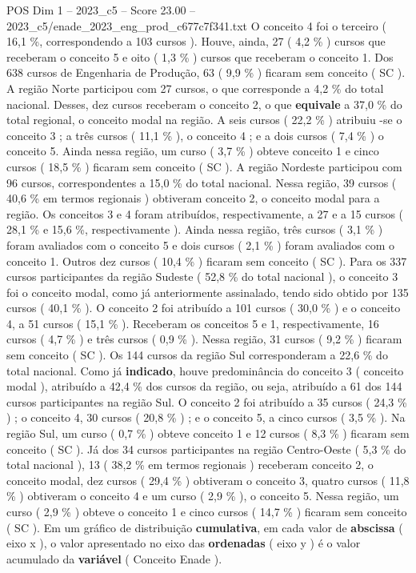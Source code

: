 \begin{textsample}{POS Dim 1 – 2023\_c5 – Score 23.00 – 2023\_c5/enade\_2023\_eng\_prod\_c677c7f341.txt}
O conceito 4 foi o terceiro ( 16,1 \%, correspondendo a 103 cursos ).
Houve, ainda, 27 ( 4,2 \% ) cursos que receberam o conceito 5 e oito ( 1,3 \% ) cursos que receberam o conceito 1.
Dos 638 cursos de Engenharia de Produção, 63 ( 9,9 \% ) ficaram sem conceito ( SC ).
A região Norte participou com 27 cursos, o que corresponde a 4,2 \% do total nacional.
Desses, dez cursos receberam o conceito 2, o que \textbf{equivale} a 37,0 \% do total regional, o conceito modal na região.
A seis cursos ( 22,2 \% ) atribuiu -se o conceito 3 ; a três cursos ( 11,1 \% ), o conceito 4 ; e a dois cursos ( 7,4 \% ) o conceito 5.
Ainda nessa região, um curso ( 3,7 \% ) obteve conceito 1 e cinco cursos ( 18,5 \% ) ficaram sem conceito ( SC ).
A região Nordeste participou com 96 cursos, correspondentes a 15,0 \% do total nacional.
Nessa região, 39 cursos ( 40,6 \% em termos regionais ) obtiveram conceito 2, o conceito modal para a região.
Os conceitos 3 e 4 foram atribuídos, respectivamente, a 27 e a 15 cursos ( 28,1 \% e 15,6 \%, respectivamente ).
Ainda nessa região, três cursos ( 3,1 \% ) foram avaliados com o conceito 5 e dois cursos ( 2,1 \% ) foram avaliados com o conceito 1.
Outros dez cursos ( 10,4 \% ) ficaram sem conceito ( SC ).
Para os 337 cursos participantes da região Sudeste ( 52,8 \% do total nacional ), o conceito 3 foi o conceito modal, como já anteriormente assinalado, tendo sido obtido por 135 cursos ( 40,1 \% ).
O conceito 2 foi atribuído a 101 cursos ( 30,0 \% ) e o conceito 4, a 51 cursos ( 15,1 \% ).
Receberam os conceitos 5 e 1, respectivamente, 16 cursos ( 4,7 \% ) e três cursos ( 0,9 \% ).
Nessa região, 31 cursos ( 9,2 \% ) ficaram sem conceito ( SC ).
Os 144 cursos da região Sul corresponderam a 22,6 \% do total nacional.
Como já \textbf{indicado}, houve predominância do conceito 3 ( conceito modal ), atribuído a 42,4 \% dos cursos da região, ou seja, atribuído a 61 dos 144 cursos participantes na região Sul.
O conceito 2 foi atribuído a 35 cursos ( 24,3 \% ) ; o conceito 4, 30 cursos ( 20,8 \% ) ; e o conceito 5, a cinco cursos ( 3,5 \% ).
Na região Sul, um curso ( 0,7 \% ) obteve conceito 1 e 12 cursos ( 8,3 \% ) ficaram sem conceito ( SC ).
Já dos 34 cursos participantes na região Centro-Oeste ( 5,3 \% do total nacional ), 13 ( 38,2 \% em termos regionais ) receberam conceito 2, o conceito modal, dez cursos ( 29,4 \% ) obtiveram o conceito 3, quatro cursos ( 11,8 \% ) obtiveram o conceito 4 e um curso ( 2,9 \% ), o conceito 5.
Nessa região, um curso ( 2,9 \% ) obteve o conceito 1 e cinco cursos ( 14,7 \% ) ficaram sem conceito ( SC ).
Em um gráfico de distribuição \textbf{cumulativa}, em cada valor de \textbf{abscissa} ( eixo x ), o valor apresentado no eixo das \textbf{ordenadas} ( eixo y ) é o valor acumulado da \textbf{variável} ( Conceito Enade ).

\end{textsample}
